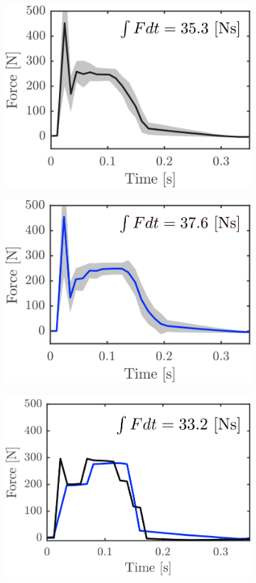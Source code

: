 \begin{figure}[h]
\centering
  \begin{subfigure}{0.32\textwidth}
  \centering
  \includegraphics[width=.9\linewidth]{STYLESTUFF/impulsecompare1.png}
   \caption{}
    \label{fig:imp1}
  \end{subfigure}
    \begin{subfigure}{0.32\textwidth}
  \centering
  \includegraphics[width=.9\linewidth]{STYLESTUFF/impulsecompare2.png}
   \caption{}
    \label{fig:imp2}
  \end{subfigure}
  \begin{subfigure}{0.32\textwidth}
    \centering
  \includegraphics[width=.9\linewidth]{STYLESTUFF/impulsecompare3.png}

\end{subfigure}
\end{figure}
